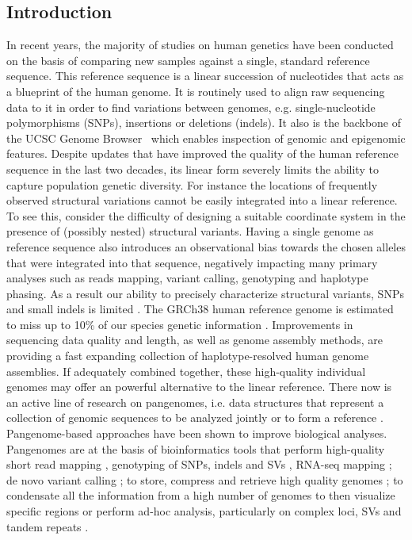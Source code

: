 \subsection{Introduction}
In recent years, the majority of studies on human genetics have been conducted on the basis of comparing new samples against a single, standard reference sequence. This reference sequence is a linear succession of nucleotides that acts as a blueprint of the human genome. It is routinely used to align raw sequencing data to it in order to find variations between genomes, e.g. single-nucleotide polymorphisms (SNPs), insertions or deletions (indels). It also is the backbone of the UCSC Genome Browser~\cite{ucsc} which enables inspection of genomic and epigenomic features. Despite updates that have improved the quality of the human reference sequence in the last two decades, its linear form severely limits the ability to capture population genetic diversity. For instance the locations of frequently observed structural variations cannot be easily integrated into a linear reference. To see this, consider the difficulty of designing a suitable coordinate system in the presence of (possibly nested) structural variants. Having a single genome as reference sequence also introduces an observational bias towards the chosen alleles that were integrated into that sequence, negatively impacting many primary analyses such as reads mapping, variant calling, genotyping and haplotype phasing. As a result our ability to precisely characterize structural variants, SNPs and small indels is limited \cite{vg,computational_pangenomics,giraffe}. The GRCh38 human reference genome is estimated to miss up to 10\% of our species genetic information \mbox{\cite{human-pangenomics-era}}.
Improvements in sequencing data quality and length, as well as  genome assembly methods, are providing a fast expanding collection of haplotype-resolved human genome assemblies. If adequately combined together, these high-quality individual genomes may offer an powerful alternative to the linear reference. There now is an active line of research on pangenomes, i.e. data structures that represent a collection of genomic sequences to be analyzed jointly or to form a reference \cite{computational_pangenomics,hpp}. 
Pangenome-based approaches have been shown to improve biological analyses. Pangenomes are at the basis of bioinformatics tools that perform high-quality short read mapping \mbox{\cite{giraffe}}, genotyping of SNPs, indels and SVs \mbox{\cite{pangenie}}, RNA-seq mapping \mbox{\cite{hdpr}}; de novo variant calling \mbox{\cite{vg}}; to store, compress and retrieve high quality genomes \mbox{\cite{gbz}}; to condensate all the information from a high number of genomes to then visualize specific regions or perform ad-hoc analysis, particularly on complex loci, SVs and tandem repeats \mbox{\cite{hdpr}}.
